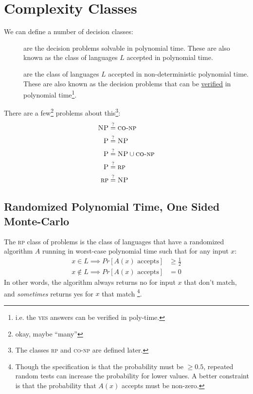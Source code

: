             \section{Complexity Classes} %
            \label{sec:complexity_classes}
                We can define a number of decision classes:
                \begin{description}
                    \item[\p] are the decision problems solvable in polynomial time.
                        These are also known as the class of languages $L$ accepted in polynomial time.
                    \item[\np] are the class of languages $L$ accepted in non-deterministic polynomial time.
                        These are also known as the decision problems that can be \uline{verified} in polynomial time\footnote{i.e. the \textsc{yes} answers can be verified in poly-time.}.
                \end{description}
                There are a few\footnote{okay, maybe ``many''} \open problems about this\footnote{The classes \textsc{rp} and \textsc{co-np} are defined later.}: %
                \begin{align*}
                    \textsc{NP} &\stackrel{?}{=} \textsc{co-np} \\
                    \textsc{P} &\stackrel{?}{=} \textsc{NP} \\
                    \textsc{P} &\stackrel{?}{=} \textsc{NP} \cup \textsc{co-np} \\
                    \textsc{P} &\stackrel{?}{=} \textsc{rp} \\
                    \textsc{rp} &\stackrel{?}{=} \textsc{NP}
                \end{align*}
                \subsection{Randomized Polynomial Time, One Sided Monte-Carlo} %
                \label{sub:randomized_polynomial_time_one_sided_monte_carlo}
                    The \textsc{rp} class of problems is the class of languages that have a randomized algorithm $A$ running in worst-case polynomial time such that for any input $x$:
                    \begin{align*}
                        x \in L \implies Pr[\text{$A(x)$ accepts}] & \ge \frac{1}{2} \\
                        x \not \in L \implies Pr[\text{$A(x)$ accepts}] & = 0
                    \end{align*}
                    In other words, the algorithm always returns no for input $x$ that don't match, and \textit{sometimes} returns yes for $x$ that match
                    \footnote{Though the specification is that the probability must be $\ge 0.5$, repeated random tests can increase the probability for lower values. A better constraint is that the probability that $A(x)$ accepts must be non-zero.}.

